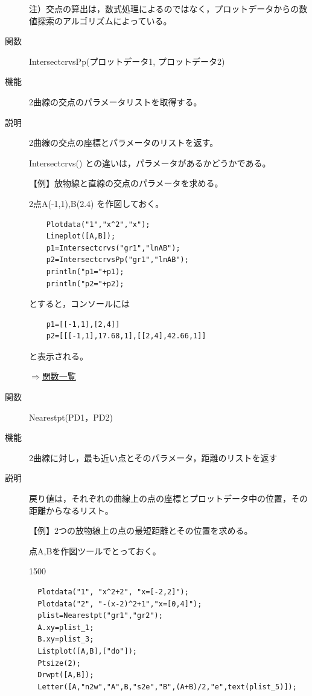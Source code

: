 \documentclass[papersize,a4paper,12pt,uplatex]{jsarticle}
\begin{document}
\begin{description}
\vspace{\baselineskip}
注）交点の算出は，数式処理によるのではなく，プロットデータからの数値探索のアルゴリズムによっている。

\vspace{\baselineskip}
\hypertarget{intersectcrvspp}{}
\item[関数]  IntersectcrvsPp(プロットデータ1, プロットデータ2)
\item[機能]  2曲線の交点のパラメータリストを取得する。
\item[説明]  2曲線の交点の座標とパラメータのリストを返す。

Intersectcrvs() との違いは，パラメータがあるかどうかである。

\vspace{\baselineskip}
【例】放物線と直線の交点のパラメータを求める。

2点A(-1,1),B(2.4) を作図しておく。
\begin{verbatim}
    Plotdata("1","x^2","x");
    Lineplot([A,B]);
    p1=Intersectcrvs("gr1","lnAB");
    p2=IntersectcrvsPp("gr1","lnAB");
    println("p1="+p1);
    println("p2="+p2);
\end{verbatim}
とすると，コンソールには
\begin{verbatim}
    p1=[[-1,1],[2,4]] 
    p2=[[[-1,1],17.68,1],[[2,4],42.66,1]]
\end{verbatim}
と表示される。
\begin{flushright}  \hyperlink{functionlist}{$\Rightarrow$関数一覧}\end{flushright}

\vspace{\baselineskip}
\hypertarget{nearestpt}{}
\item[関数]  Nearestpt(PD1，PD2)
\item[機能]  2曲線に対し，最も近い点とそのパラメータ，距離のリストを返す
\item[説明]  戻り値は，それぞれの曲線上の点の座標とプロットデータ中の位置，その距離からなるリスト。

\vspace{\baselineskip}
【例】2つの放物線上の点の最短距離とその位置を求める。

点A,Bを作図ツールでとっておく。

\begin{layer}{150}{0}
\end{layer}

\begin{verbatim}
  Plotdata("1", "x^2+2", "x=[-2,2]");
  Plotdata("2", "-(x-2)^2+1","x=[0,4]");
  plist=Nearestpt("gr1","gr2");
  A.xy=plist_1;
  B.xy=plist_3;
  Listplot([A,B],["do"]);
  Ptsize(2);
  Drwpt([A,B]);
  Letter([A,"n2w","A",B,"s2e","B",(A+B)/2,"e",text(plist_5)]);
\end{verbatim}


\end{description}
\end{document}
